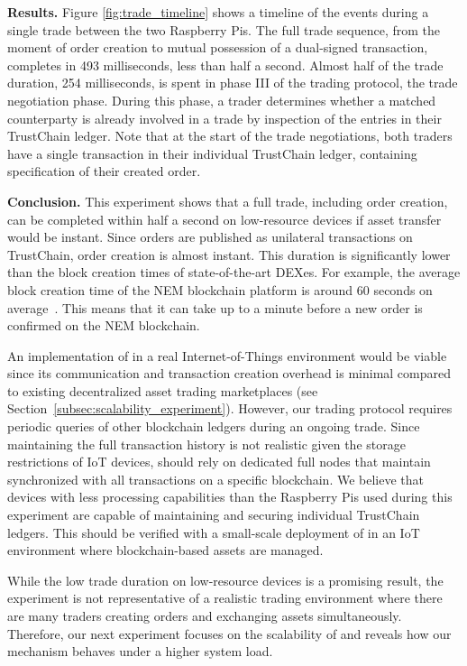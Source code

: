 \textbf{Results.}
Figure \ref{fig:trade_timeline} shows a timeline of the events during a single trade between the two Raspberry Pis.
The full trade sequence, from the moment of order creation to mutual possession of a dual-signed \TRTradeDone{} transaction, completes in 493 milliseconds, less than half a second.
Almost half of the trade duration, 254 milliseconds, is spent in phase III of the \ModelName{} trading protocol, the trade negotiation phase.
During this phase, a trader determines whether a matched counterparty is already involved in a trade by inspection of the entries in their TrustChain ledger.
Note that at the start of the trade negotiations, both traders have a single transaction in their individual TrustChain ledger, containing specification of their created order.

\textbf{Conclusion.}
This experiment shows that a full trade, including order creation, can be completed within half a second on low-resource devices if asset transfer would be instant.
Since orders are published as unilateral transactions on TrustChain, order creation is almost instant.
This duration is significantly lower than the block creation times of state-of-the-art DEXes.
For example, the average block creation time of the NEM blockchain platform is around 60 seconds on average~\cite{nem2018nem}.
This means that it can take up to a minute before a new order is confirmed on the NEM blockchain.

An implementation of \ModelName{} in a real Internet-of-Things environment would be viable since its communication and transaction creation overhead is minimal compared to existing decentralized asset trading marketplaces (see Section~\ref{subsec:scalability_experiment}).
However, our trading protocol requires periodic queries of other blockchain ledgers during an ongoing trade.
Since maintaining the full transaction history is not realistic given the storage restrictions of IoT devices, \ModelName{} should rely on dedicated full nodes that maintain synchronized with all transactions on a specific blockchain.
We believe that devices with less processing capabilities than the Raspberry Pis used during this experiment are capable of maintaining and securing individual TrustChain ledgers.
This should be verified with a small-scale deployment of \ModelName{} in an IoT environment where blockchain-based assets are managed.

While the low trade duration on low-resource devices is a promising result, the experiment is not representative of a realistic trading environment where there are many traders creating orders and exchanging assets simultaneously.
Therefore, our next experiment focuses on the scalability of \ModelName{} and reveals how our mechanism behaves under a higher system load.

